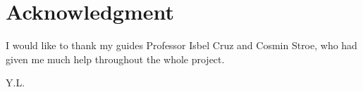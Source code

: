 \section*{Acknowledgment}
I would like to thank my guides Professor Isbel Cruz and Cosmin Stroe, who had given me much help throughout the whole project.\\

\begin{flushright}
Y.L.\\[1pc]
\end{flushright}